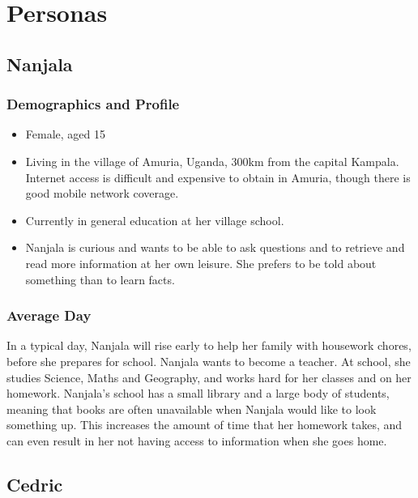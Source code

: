 \documentclass[authoryearcitations]{UoYCSproject}
\begin{document}
\newpage
\chapter{Personas}
\label{sec:appendixPersonas}
\section{Nanjala}
\subsection{Demographics and Profile}
\begin{itemize}
  \item Female, aged 15
  \item Living in the village of Amuria, Uganda, 300km from the capital Kampala.  Internet access is difficult and expensive to obtain in Amuria, though there is good mobile network coverage.
  \item Currently in general education at her village school.
  \item Nanjala is curious and wants to be able to ask questions and to retrieve and read more information at her own leisure.  She prefers to be told about something than to learn facts.
\end{itemize}
\subsection{Average Day}
In a typical day, Nanjala will rise early to help her family with housework chores, before she prepares for school.  Nanjala wants to become a teacher.  At school, she studies Science, Maths and Geography, and works hard for her classes and on her homework.  Nanjala's school has a small library and a large body of students, meaning that books are often unavailable when Nanjala would like to look something up.  This increases the amount of time that her homework takes, and can even result in her not having access to information when she goes home.

\newpage
\section{Cedric}
\end{document}
